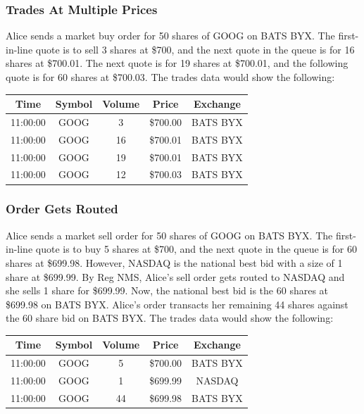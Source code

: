 \documentclass{article}
\begin{document}
\subsubsection{Trades At Multiple Prices}
Alice sends a market buy order for 50 shares of GOOG on BATS BYX. The first-in-line quote is to sell 3 shares at \$700, and the next quote in the queue is for 16 shares at \$700.01. The next quote is for 19 shares at \$700.01, and the following quote is for 60 shares at \$700.03. The trades data would show the following:
\begin{center}
  \begin{tabular}{| c | c | c | c | c |}
    \hline
    Time & Symbol & Volume & Price & Exchange \\ \hline
    11:00:00 & GOOG & 3 & \$700.00 & BATS BYX \\ \hline
    11:00:00 & GOOG & 16 & \$700.01 & BATS BYX \\ \hline
    11:00:00 & GOOG & 19 & \$700.01 & BATS BYX \\ \hline
    11:00:00 & GOOG & 12 & \$700.03 & BATS BYX \\
    \hline
  \end{tabular}
\end{center}
\subsubsection{Order Gets Routed}
Alice sends a market sell order for 50 shares of GOOG on BATS BYX. The first-in-line quote is to buy 5 shares at \$700, and the next quote in the queue is for 60 shares at \$699.98. However, NASDAQ is the national best bid with a size of 1 share at \$699.99. By Reg NMS, Alice's sell order gets routed to NASDAQ and she sells 1 share for \$699.99. Now, the national best bid is the 60 shares at \$699.98 on BATS BYX. Alice's order transacts her remaining 44 shares against the 60 share bid on BATS BYX. The trades data would show the following:
\begin{center}
  \begin{tabular}{| c | c | c | c | c |}
    \hline
    Time & Symbol & Volume & Price & Exchange \\ \hline
    11:00:00 & GOOG & 5 & \$700.00 & BATS BYX \\ \hline
    11:00:00 & GOOG & 1 & \$699.99 & NASDAQ \\ \hline
    11:00:00 & GOOG & 44 & \$699.98 & BATS BYX \\
    \hline
  \end{tabular}
\end{center}
\end{document}
